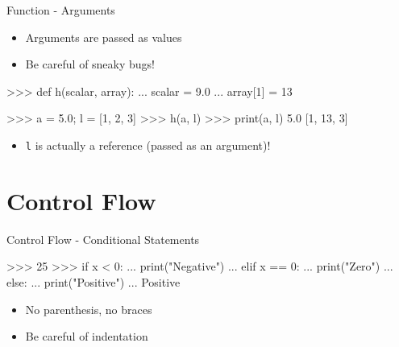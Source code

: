 \documentclass[10pt]{beamer}
\begin{document}

\begin{frame}[fragile]{Function - Arguments}

    \begin{itemize}
        \item Arguments are passed as values
        \item \pause Be careful of sneaky bugs!
    \end{itemize}

    \pause

    \begin{pythoncode}
        >>> def h(scalar, array):
        ...     scalar = 9.0
        ...     array[1] = 13

        >>> a = 5.0; l = [1, 2, 3]
        >>> h(a, l)
        >>> print(a, l)
        5.0 [1, 13, 3]
    \end{pythoncode}

    \begin{itemize}
        \item \pause \texttt{l} is actually a reference (passed as an argument)!
    \end{itemize}

\end{frame}


\section{Control Flow}


\begin{frame}[fragile]{Control Flow - Conditional Statements}

    \begin{pythoncode}
        >>> 25
        >>> if x < 0:
        ...     print("Negative")
        ... elif x == 0:
        ...     print("Zero")
        ... else:
        ...     print("Positive")
        ...
        Positive

    \end{pythoncode}

    \begin{itemize}
        \item \pause No parenthesis, no braces
        \item \pause Be careful of indentation
    \end{itemize}

\end{frame}
\end{document}
